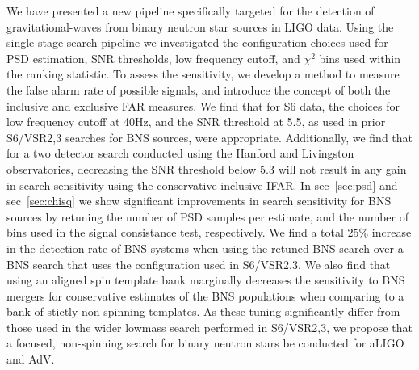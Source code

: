 We have presented a new pipeline specifically targeted for the detection of gravitational-waves from binary neutron star sources in LIGO data. Using the single stage search pipeline we investigated the configuration choices used for PSD estimation, SNR thresholds, low frequency cutoff, and $\chi^2$ bins used within the ranking statistic. To assess the sensitivity, we develop a method to measure the false alarm rate of possible signals, and introduce the concept of both the inclusive and exclusive FAR measures. We find that for S6 data, the choices for low frequency cutoff at 40Hz, and the SNR threshold at 5.5, as used in prior S6/VSR2,3 searches for BNS sources, were appropriate. Additionally, we find that for a two detector search conducted using the Hanford and Livingston observatories, decreasing the SNR threshold below 5.3 will not result in any gain in search sensitivity using the conservative inclusive IFAR. In sec~\ref{sec:psd} and sec~\ref{sec:chisq} we show significant improvements in search sensitivity for BNS sources by retuning the number of PSD samples per estimate, and the number of bins used in the signal consistance test, respectively. We find a total $25\%$ increase in the detection rate of BNS systems when using the retuned BNS search over a BNS search that uses the configuration used in S6/VSR2,3. We also find that using an aligned spin template bank marginally decreases the sensitivity 
to BNS mergers for conservative estimates of the BNS populations when comparing to a bank of stictly non-spinning templates. As these tuning significantly differ from those used in the wider lowmass search performed in S6/VSR2,3, we propose that a focused, non-spinning search for binary neutron stars be conducted for aLIGO and AdV.

\label{sec:conclusions}
